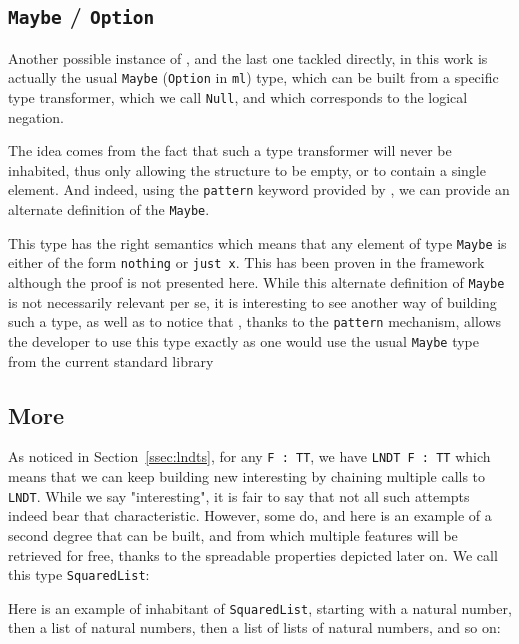 \documentclass[a4paper,UKenglish,cleveref, autoref, thm-restate]{lipics}
\begin{document}
\subsection{\texttt{Maybe} / \texttt{Option}}\label{ssec:maybe}

Another possible instance of \linear, and the last one tackled directly, in this work is actually the usual \texttt{Maybe} (\texttt{Option} in \texttt{ml}) type, which can be built from a specific type transformer, which we call \texttt{Null}, and which corresponds to the logical negation.

\lndtnull

The idea comes from the fact that such a type transformer will never be inhabited, thus only allowing the structure to be empty, or to contain a single element. And indeed, using the \texttt{pattern} keyword provided by \agda, we can provide an alternate definition of the \texttt{Maybe}.

\maybe

This type has the right semantics which means that any element of type \texttt{Maybe} is either of the form \texttt{nothing} or \texttt{just x}. This has been proven in the framework although the proof is not presented here. While this alternate definition of \texttt{Maybe} is not necessarily relevant per se, it is interesting to see another way of building such a type, as well as to notice that \agda, thanks to the \texttt{pattern} mechanism, allows the developer to use this type exactly as one would use the usual \texttt{Maybe} type from the current \agda standard library

\subsection{More \linears}\label{ssec:morelndt}

As noticed in Section~\ref{ssec:lndts}, for any \texttt{F : TT}, we have \texttt{LNDT F : TT} which means that we can keep building new interesting \linears by chaining multiple calls to \texttt{LNDT}. While we say "interesting", it is fair to say that not all such attempts indeed bear that characteristic. However, some do, and here is an example of a second degree \linear that can be built, and from which multiple features will be retrieved for free, thanks to the spreadable properties depicted later on. We call this type \texttt{SquaredList}:

\lndtlist

Here is an example of inhabitant of \texttt{SquaredList}, starting with a natural number, then a list of natural numbers, then a list of lists of natural numbers, and so on:
\end{document}
